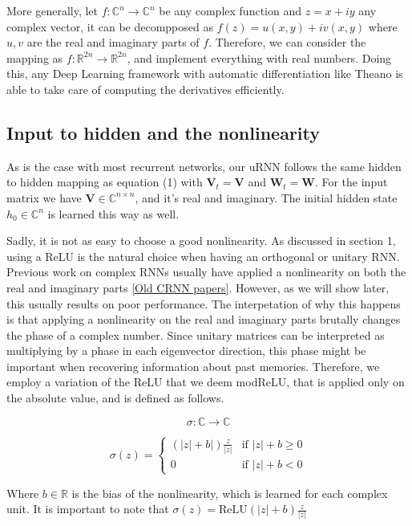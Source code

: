 \documentclass{article} %
\newcommand{\matr}[1]{\mathbf{#1}}
\newcommand\RR{\mathbb{R}}
\newcommand\CC{\mathbb{C}}
\begin{document}
More generally, let $f: \CC^n \rightarrow \CC^n$ be any complex function and $z = x + i y$ any complex vector, it can be decompposed as $ f(z) = u(x, y) + i v(x, y) $ where $u,v$ are the real and imaginary parts of $f$. Therefore, we can consider the mapping as $f: \RR^{2n}  \rightarrow \RR^{2n}$, and implement everything with real numbers. Doing this, any Deep Learning framework with automatic differentiation like Theano \citep{Fred2010} is able to take care of computing the derivatives efficiently.

\subsection{Input to hidden and the nonlinearity}

As is the case with most recurrent networks, our uRNN follows the same hidden to hidden mapping as equation (1) with $\matr{V}_t = \matr{V}$ and $\matr{W}_t = \matr{W}$. For the input matrix we have $\matr{V} \in \CC^{n \times n}$, and it's real and imaginary. The initial hidden state $h_0 \in \CC^n$ is learned this way as well.

Sadly, it is not as easy to choose a good nonlinearity. As discussed in section 1, using a ReLU is the natural choice when having an orthogonal or unitary RNN. Previous work on complex RNNs usually have applied a nonlinearity on both the real and imaginary parts \ref{Old CRNN papers}. However, as we will show later, this usually results on poor performance. The interpetation of why this happens is that applying a nonlinearity on the real and imaginary parts brutally changes the phase of a complex number. Since unitary matrices can be interpreted as multiplying by a phase in each eigenvector direction, this phase might be important when recovering information about past memories. Therefore, we employ a variation of the ReLU that we deem modReLU, that is applied only on the absolute value, and is defined as follows.

$$ \sigma: \CC \rightarrow \CC $$

$$ \sigma (z) = 
\left\{
  \begin{array}{ll}
    (|z|+b|) \frac{z}{|z|}  & \mbox{if } |z| + b \geq 0 \\
    0 & \mbox{if } |z| + b < 0
  \end{array}
\right.
$$


Where $b \in \RR$ is the bias of the nonlinearity, which is learned for each complex unit. It is important to note that $\sigma(z) = \text{ReLU}(|z| + b) \frac{z}{|z|}$
\end{document}
